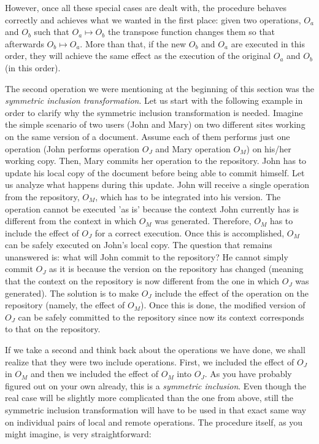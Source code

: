 However, once all these special cases are dealt with, the procedure behaves correctly
and achieves what we wanted in the first place: given two operations, $O_{a}$ and $O_{b}$
such that $O_{a} \mapsto O_{b}$ the transpose function changes them so that afterwards
$O_{b} \mapsto O_{a}$. More than that, if the new $O_{b}$ and $O_{a}$ are executed in
this order, they will achieve the same effect as the execution of the original
$O_{a}$ and $O_{b}$ (in this order).

The second operation we were mentioning at the beginning of this section was the
\emph{symmetric inclusion transformation}. Let us start with the following example
in order to clarify why the symmetric inclusion transformation is needed. Imagine
the simple scenario of two users (John and Mary) on two different sites working
on the same version of a document. Assume each of them performs just one operation
(John performs operation $O_{J}$ and Mary operation $O_{M}$) on his/her working copy.
Then, Mary commits her operation to the repository. John has to update his local copy
of the document before being able to commit himself. Let us analyze what happens
during this update. John will receive a single operation from the repository, $O_{M}$,
which has to be integrated into his version. The operation cannot be executed 'as is' because
the context John currently has is different from the context in which $O_{M}$ was
generated. Therefore, $O_{M}$ has to include the effect of $O_{J}$ for a correct execution.
Once this is accomplished, $O_{M}$ can be safely
executed on John's local copy. The question that remains unanswered is: what will
John commit to the repository? He cannot simply commit $O_{J}$ as it is because
the version on the repository has changed (meaning that the context on the repository
is now different from the one in which $O_{J}$ was generated). The solution is
to make $O_{J}$ include the effect of the operation on the repository (namely, the
effect of $O_{M}$). Once this is done, the modified version of $O_{J}$ can be safely
committed to the repository since now its context corresponds to that on the repository.

If we take a second and think back about the operations we have done, we shall realize
that they were two include operations. First, we included the effect of $O_{J}$ in
$O_{M}$ and then we included the effect of $O_{M}$ into $O_{J}$. As you have probably
figured out on your own already, this is a \emph{symmetric inclusion}. Even though
the real case will be slightly more complicated than the one from above, still the
symmetric inclusion transformation will have to be used in that exact same way on
individual pairs of local and remote operations. The procedure itself, as you
might imagine, is very straightforward:


